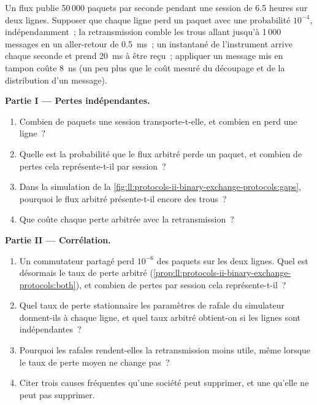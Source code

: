 \begin{problem}\label{pb:ll:protocols-ii-binary-exchange-protocols:1}
Un flux publie 50\,000 paquets par seconde pendant une session de 6.5 heures sur deux lignes. Supposer que chaque ligne perd un paquet avec une probabilité
$10^{-4}$, indépendamment~; la retransmission comble les trous allant jusqu'à 1\,000 messages en un aller-retour de \qty{0.5}{\milli\second}~; un
instantané de l'instrument arrive chaque seconde et prend \qty{20}{\milli\second} à être reçu~; appliquer un message mis en tampon coûte
\qty{8}{\nano\second} (un peu plus que le coût mesuré du découpage et de la distribution d'un message).

\medskip\noindent\textbf{Partie I --- Pertes indépendantes.}
\begin{enumerate}
\item Combien de paquets une session transporte-t-elle, et combien en perd une ligne~?
\item Quelle est la probabilité que le flux arbitré perde un paquet, et combien de pertes cela représente-t-il par session~?
\item Dans la simulation de la \cref{fig:ll:protocols-ii-binary-exchange-protocols:gaps}, pourquoi le flux arbitré présente-t-il encore des trous~?
\item Que coûte chaque perte arbitrée avec la retransmission~?
\end{enumerate}

\medskip\noindent\textbf{Partie II --- Corrélation.}
\begin{enumerate}[resume]
\item Un commutateur partagé perd $10^{-6}$ des paquets sur les deux lignes. Quel est désormais le taux de perte arbitré (\cref{prop:ll:protocols-ii-binary-exchange-protocols:both}), et combien de pertes par session cela représente-t-il~?
\item Quel taux de perte stationnaire les paramètres de rafale du simulateur donnent-ils à chaque ligne, et quel taux arbitré obtient-on si les lignes sont
indépendantes~?
\item Pourquoi les rafales rendent-elles la retransmission moins utile, même lorsque le taux de perte moyen ne change pas~?
\item Citer trois causes fréquentes qu'une société peut supprimer, et une qu'elle ne peut pas supprimer.
\end{enumerate}


\end{problem}
